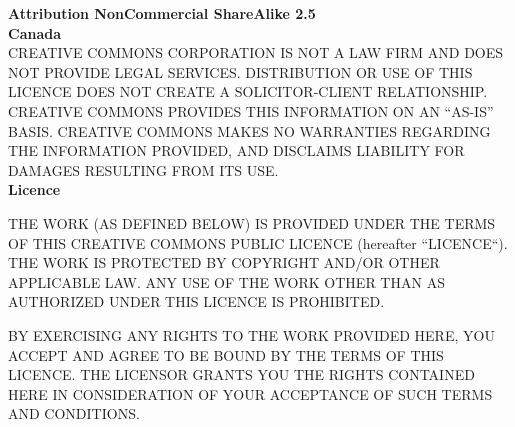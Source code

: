 \textbf{Attribution NonCommercial ShareAlike 2.5 \\ Canada } \\

CREATIVE COMMONS CORPORATION IS NOT A LAW FIRM AND DOES NOT PROVIDE LEGAL SERVICES. DISTRIBUTION OR USE OF THIS LICENCE DOES NOT CREATE A SOLICITOR-CLIENT RELATIONSHIP. CREATIVE COMMONS PROVIDES THIS INFORMATION ON AN ``AS-IS'' BASIS. CREATIVE COMMONS MAKES NO WARRANTIES REGARDING THE INFORMATION PROVIDED, AND DISCLAIMS LIABILITY FOR DAMAGES RESULTING FROM ITS USE. \\

\textbf{Licence \\}

THE WORK (AS DEFINED BELOW) IS PROVIDED UNDER THE TERMS OF THIS CREATIVE COMMONS PUBLIC LICENCE (hereafter ``LICENCE``). THE WORK IS PROTECTED BY COPYRIGHT AND/OR OTHER APPLICABLE LAW. ANY USE OF THE WORK OTHER THAN AS AUTHORIZED UNDER THIS LICENCE IS PROHIBITED.


BY EXERCISING ANY RIGHTS TO THE WORK PROVIDED HERE, YOU ACCEPT AND AGREE TO BE BOUND BY THE TERMS OF THIS LICENCE. THE LICENSOR GRANTS YOU THE RIGHTS CONTAINED HERE IN CONSIDERATION OF YOUR ACCEPTANCE OF SUCH TERMS AND CONDITIONS.


